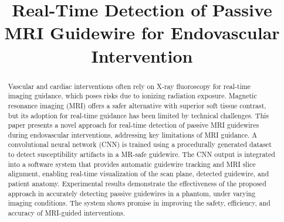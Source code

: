 \documentclass[conference]{IEEEtran}
\begin{document}
\title{Real-Time Detection of Passive MRI Guidewire for Endovascular Intervention}

\author{
\and
{}
\and
{}
}

\maketitle

\begin{abstract}
Vascular and cardiac interventions often rely on X-ray fluoroscopy for real-time imaging guidance, which poses risks due to ionizing radiation exposure. Magnetic resonance imaging (MRI) offers a safer alternative with superior soft tissue contrast, but its adoption for real-time guidance has been limited by technical challenges. This paper presents a novel approach for real-time detection of passive MRI guidewires during endovascular interventions, addressing key limitations of MRI guidance. A convolutional neural network (CNN) is trained using a procedurally generated dataset to detect susceptibility artifacts in a MR-safe guidewire. The CNN output is integrated into a software system that provides automatic guidewire tracking and MRI slice alignment, enabling real-time visualization of the scan plane, detected guidewire, and patient anatomy. Experimental results demonstrate the effectiveness of the proposed approach in accurately detecting passive guidewires in a phantom, under varying imaging conditions. The system shows promise in improving the safety, efficiency, and accuracy of MRI-guided interventions.
\end{abstract}
\end{document}
